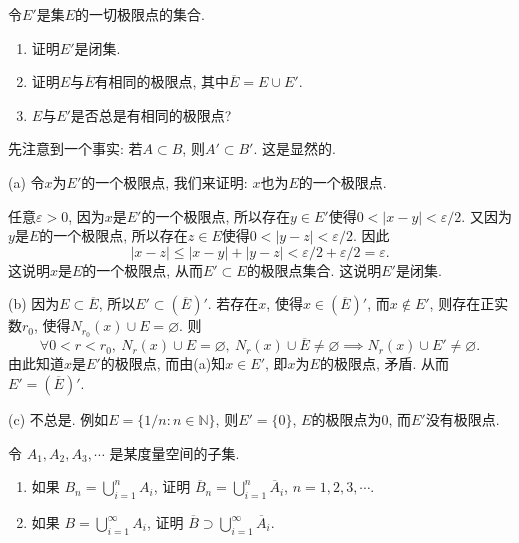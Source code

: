 \documentclass{article}
\begin{document}
\begin{problem}[2-6]
    令\( E' \)是集\( E \)的一切极限点的集合.
    \begin{enumerate}[label=(\alph*)]
        \item 证明\( E' \)是闭集.
        \item 证明\( E \)与\( \overline{E } \)有相同的极限点, 其中\( \overline{E}=E\cup E' \). 
        \item \( E  \)与\( E' \)是否总是有相同的极限点?
    \end{enumerate}
\end{problem}

\begin{solution}
    先注意到一个事实: 若\( A\subset B \), 则\( A'\subset B' \). 这是显然的.\par
    (a) 令\( x \)为\( E' \)的一个极限点, 我们来证明: \( x \)也为\( E \)的一个极限点.\par
    任意\( \varepsilon > 0 \), 因为\( x \)是\( E' \)的一个极限点, 所以存在\( y \in E' \)使得\( 0 < |x-y| < \varepsilon/2 \). 又因为\( y \)是\( E \)的一个极限点, 所以存在\( z \in E \)使得\( 0 < |y-z| < \varepsilon/2 \). 因此
    \[|x-z| \leq |x-y| + |y-z| < \varepsilon/2 + \varepsilon/2 = \varepsilon. \]
    这说明\( x \)是\( E \)的一个极限点, 从而\( E' \subset E \)的极限点集合. 这说明\( E' \)是闭集.\par
    (b) 因为\( E \subset \overline{E} \), 所以\( E'\subset(\overline{E})' \). 若存在\( x \), 使得\( x\in(\overline{E })' \), 而\( x\not\in E' \), 则存在正实数\( r_0 \), 使得\( N_{r_0}(x)\cup E=\varnothing \). 则
    \[ \forall 0<r<r_0,\ N_{r}(x)\cup E=\varnothing,\ N_{r}(x)\cup\overline{E}\neq\varnothing\implies N_{r}(x)\cup E'\neq\varnothing. \] 
    由此知道\( x \)是\( E' \)的极限点, 而由(a)知\( x\in E' \), 即\( x \)为\( E \)的极限点, 矛盾. 从而\( E'=(\overline{E})' \).\par
    (c) 不总是. 例如\( E=\{1/n:n\in\mathbb{N}\} \), 则\( E'=\{0\} \), \( E \)的极限点为\( 0 \), 而\( E' \)没有极限点.
\end{solution}

\begin{problem}[2-7]
    令 \( A_1, A_2, A_3, \cdots \) 是某度量空间的子集. 
    \begin{enumerate}[label=(\alph*)]
        \item 如果 \( B_n = \bigcup_{i=1}^n A_i \), 证明 \( \overline{B}_n = \bigcup_{i=1}^n \overline{A}_i \), \( n = 1, 2, 3, \cdots \). 
        \item 如果 \( B = \bigcup_{i=1}^\infty A_i \), 证明 \( \overline{B} \supset \bigcup_{i=1}^\infty \overline{A}_i \). 
    \end{enumerate}
\end{problem}
\end{document}
